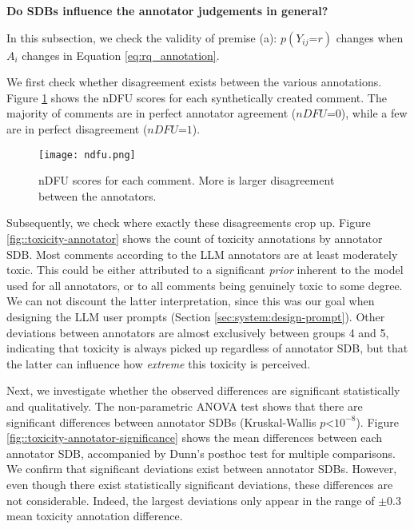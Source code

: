 \textbf{Do SDBs influence the annotator judgements in general?}

In this subsection, we check the validity of premise (a): $p(Y_{ij} \text{=} r)$ changes when $A_i$ changes in Equation \ref{eq:rq_annotation}.

We first check whether disagreement exists between the various annotations. Figure \ref{fig::toxicity-ndfu} shows the  \ac{nDFU}\cite{pavlopoulos-likas-2024-polarized} scores for each synthetically created comment. The majority of comments are in perfect annotator agreement ($nDFU\text{=}0$), while a few are in perfect disagreement ($nDFU\text{=}1$).

\begin{figure}
	\centering
	\texttt{[image: ndfu.png]}
	\caption{\ac{nDFU} \cite{pavlopoulos-likas-2024-polarized} scores for each comment. More is larger disagreement between the annotators.}
	\label{fig::toxicity-ndfu}
\end{figure}

Subsequently, we check where exactly these disagreements crop up. Figure \ref{fig::toxicity-annotator} shows the count of toxicity annotations by annotator \ac{SDB}. Most comments according to the LLM annotators are at least moderately toxic. This could be either attributed to a significant \textit{prior} inherent to the model used for all annotators, or to all comments being genuinely toxic to some degree. We can not discount the latter interpretation, since this was our goal when designing the LLM user prompts (Section \ref{sec:system:design-prompt}). Other deviations between annotators are almost exclusively between groups 4 and 5, indicating that toxicity is always picked up regardless of annotator \ac{SDB}, but that the latter can influence how \textit{extreme} this toxicity is perceived.

Next, we investigate whether the observed differences are significant statistically and qualitatively. The non-parametric ANOVA test shows that there are significant differences between annotator \acp{SDB} (Kruskal-Wallis $p\text{<}10^{-8}$). Figure \ref{fig::toxicity-annotator-significance} shows the mean differences between each annotator \ac{SDB}, accompanied by Dunn's posthoc test for multiple comparisons. We confirm that significant deviations exist between annotator \acp{SDB}. However, even though there exist statistically significant deviations, these differences are not considerable. Indeed, the largest deviations only appear in the range of $\pm 0.3$ mean toxicity annotation difference.

